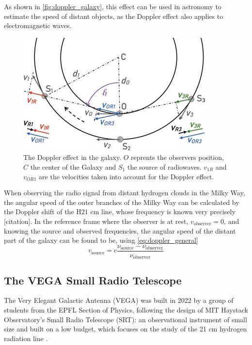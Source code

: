 As shown in \autoref{fig:doppler_galaxy}, this effect can be used in astronomy to estimate the speed of distant objects, as the Doppler effect also applies to electromagnetic waves.
\begin{figure}[htbp]
    \centering
    \includegraphics[width=0.6\linewidth]{figures/doppler_galaxy.png}
    \caption{The Doppler effect in the galaxy. $O$ reprents the observers position, $C$ the center of the Galaxy and $S_1$ the source of radiowaves. $v_{1R}$ and $v_{OR1}$ are the velocities taken into account for the Doppler effect. \cite{lauterbach_radio_2022}}
    \label{fig:doppler_galaxy}
\end{figure}
When observing the radio signal from distant hydrogen clouds in the Milky Way, the angular speed of the outer branches of the Milky Way can be calculated by the Doppler shift of the H$21$ cm line, whose frequency is known very precisely [citation].
In the reference frame where the observer is at rest, $v_\textrm{observer} = 0$, and knowing the source and observed frequencies, the angular speed of the distant part of the galaxy can be found to be, using \autoref{eq:doppler_general}
\begin{equation}
    v_\textrm{source} = c \frac{\nu_\textrm{source} - \nu_\textrm{observer}}{\nu_\textrm{observer}}
    \label{eq:doppler}
\end{equation}

\subsection{The VEGA Small Radio Telescope}
The Very Elegant Galactic Antenna (VEGA) was built in 2022 by a group of students from the EPFL Section of Physics, following the design of MIT Haystack Observatory's Small Radio Telescope (SRT): an observational instrument of small size and built on a low budget, which focuses on the study of the 21 cm hydrogen radiation line \cite{interdisciplinary_project_2022}.

